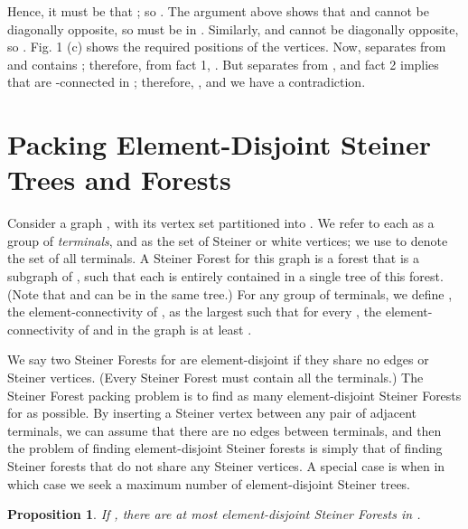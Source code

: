 \documentclass[11pt]{article}
\newtheorem{prop}[lemma]{Proposition}
\renewenvironment{proof}{\vspace{-0.1in}\noindent{\bf Proof:}}{\hspace*{\fill}\par}
\begin{document}
\begin{proof}
  Hence, it must be that ; so . The
  argument above shows that  and  cannot be diagonally opposite,
  so  must be in . Similarly,  and  cannot be
  diagonally opposite, so . Fig. 1 (c) shows the
  required positions of the vertices. Now,  separates  from 
  and contains ; therefore, from fact 1, . But
   separates  from , and fact 2 implies that  are
  -connected in ; therefore, , and we
  have a contradiction.
\end{proof}

\section{Packing Element-Disjoint Steiner Trees and Forests}
\label{sec:packingForests}

Consider a graph , with its vertex set  partitioned into
. We refer to each  as a group of
\emph{terminals}, and  as the set of Steiner or white vertices; we
use  to denote the set of all terminals. A Steiner
Forest for this graph is a forest that is a subgraph of , such that
each  is entirely contained in a single tree of this
forest. (Note that  and  can be in the same tree.)  For
any group  of terminals, we define , the
element-connectivity of , as the largest  such that for every
, the element-connectivity of  and  in the graph
 is at least .

We say two Steiner Forests for  are element-disjoint if they share
no edges or Steiner vertices. (Every Steiner Forest must contain all
the terminals.) The Steiner Forest packing problem is to find as many
element-disjoint Steiner Forests for  as possible. By inserting a
Steiner vertex between any pair of adjacent terminals, we can assume
that there are no edges between terminals, and then the problem of
finding element-disjoint Steiner forests is simply that of finding
Steiner forests that do not share any Steiner vertices. A special case
is when  in which case we seek a maximum number of element-disjoint
Steiner trees.

\begin{prop} If , there are at most 
  element-disjoint Steiner Forests in .
\end{prop}
\iffalse
\vspace{0.05in}
\begin{proof}
  Let  be a set of  white vertices that separates vertices 
  and  in . Any tree that contains both  and  must
  contain a vertex of . Hence, we can pack at most 
  trees that contain all of .\end{proof}
\fi
\end{document}
